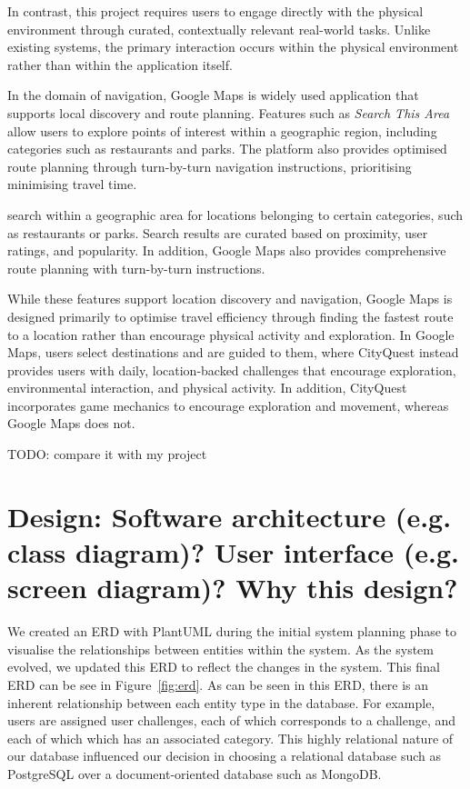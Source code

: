 \documentclass{vgtc}                          %
\begin{document}
In contrast, this project requires users to engage directly with the physical environment through curated, contextually relevant real-world tasks. Unlike existing systems, the primary interaction occurs within the physical environment rather than within the application itself.

In the domain of navigation, Google Maps is widely used application that supports local discovery and route planning. Features such as \textit{Search This Area} allow users to explore points of interest within a geographic region, including categories such as restaurants and parks. The platform also provides optimised route planning through turn-by-turn navigation instructions, prioritising minimising travel time.

search within a geographic area for locations belonging to certain categories, such as restaurants or parks. Search results are curated based on proximity, user ratings, and popularity. In addition, Google Maps also provides comprehensive route planning with turn-by-turn instructions. 

While these features support location discovery and navigation, Google Maps is designed primarily to optimise travel efficiency through finding the fastest route to a location rather than encourage physical activity and exploration. In Google Maps, users select destinations and are guided to them, where CityQuest instead provides users with daily, location-backed challenges that encourage exploration, environmental interaction, and physical activity. In addition, CityQuest incorporates game mechanics to encourage exploration and movement, whereas Google Maps does not.

{TODO: compare it with my project}

\section{Design: Software architecture (e.g. class diagram)? User interface (e.g. screen diagram)? Why this design?}

We created an ERD with PlantUML during the initial system planning phase to visualise the relationships between entities within the system. As the system evolved, we updated this ERD to reflect the changes in the system. This final ERD can be see in Figure~\ref{fig:erd}. As can be seen in this ERD, there is an inherent relationship between each entity type in the database. 
For example, users are assigned user challenges, each of which corresponds to a challenge, and each of which which has an associated category. This highly relational nature of our database influenced our decision in choosing a relational database such as PostgreSQL over a document-oriented database such as MongoDB.
\end{document}
